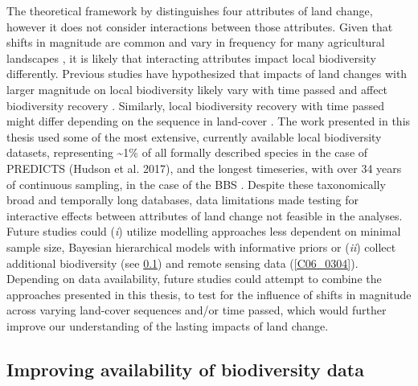 The theoretical framework by \cite{Watson2014} distinguishes four attributes of land change, however it does not consider interactions between those attributes. Given that shifts in magnitude are common and vary in frequency for many agricultural landscapes \citep{Kleyer2007}, it is likely that interacting attributes impact local biodiversity differently. Previous studies have hypothesized that impacts of land changes with larger magnitude on local biodiversity likely vary with time passed and affect biodiversity recovery \citep{Shackelford2017}. Similarly, local biodiversity recovery with time passed might differ depending on the sequence in land-cover \citep{Chazdon2003,Martin2013}. The work presented in this thesis used some of the most extensive, currently available local biodiversity datasets, representing \textasciitilde 1\% of all formally described species in the case of PREDICTS \citep{Hudson2016}(Hudson et al. 2017), and the longest timeseries, with over 34 years of continuous sampling, in the case of the BBS \citep[, Figure \ref{F01_01}]{Pardieck2018}. Despite these taxonomically broad and temporally long databases, data limitations made testing for interactive effects between attributes of land change not feasible in the analyses. Future studies could (\textit{i}) utilize modelling approaches less dependent on minimal sample size, \eg Bayesian hierarchical models with informative priors \citep{Iknayan2014} or (\textit{ii}) collect additional biodiversity (see \ref{C06_0303}) and remote sensing data (\ref{C06_0304}). Depending on data availability, future studies could attempt to combine the approaches presented in this thesis, \ie to test for the influence of shifts in magnitude across varying land-cover sequences and/or time passed, which would further improve our understanding of the lasting impacts of land change.

\subsection{Improving availability of biodiversity data}
\label{C06_0303}

